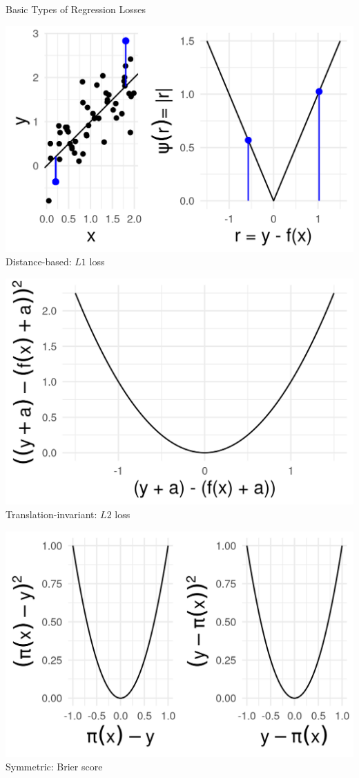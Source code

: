 \begin{vbframe}{Basic Types of Regression Losses}
\begin{minipage}[b]{0.33\textwidth}
  \includegraphics[width=\textwidth]{figure/loss_dist_based}
  \scriptsize \centering
  Distance-based: $L1$ loss
\end{minipage}%
\begin{minipage}[b]{0.33\textwidth}
  \includegraphics[width=\textwidth]{figure/loss_transl_inv.png}
  \scriptsize \centering
  Translation-invariant: $L2$ loss
\end{minipage}%
\begin{minipage}[b]{0.33\textwidth}
  \includegraphics[width=\textwidth]{figure/loss_symmetric}
  \scriptsize \centering
  Symmetric: Brier score
\end{minipage}

\end{vbframe}

